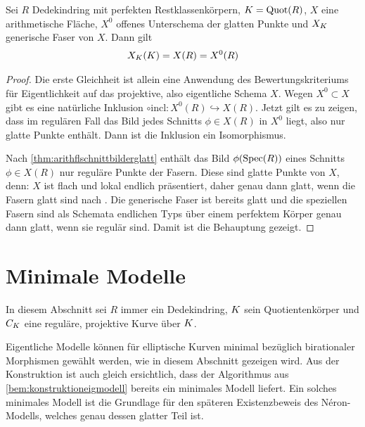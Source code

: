 \begin{Satz}\label{thm:ratpkteregulaeremodelle}
  Sei $R$ Dedekindring
  mit perfekten Restklassenkörpern,
  $K=\operatorname{Quot}(R)$,
  $X$ eine arithmetische Fläche,
  $X^0$ offenes Unterschema der glatten Punkte und
  $X_{K}$ generische Faser von $X$.
  Dann gilt
  \begin{gather*}
    X_{K}(K)=X(R)=X^0(R)
  \end{gather*}
  \begin{proof}
    Die erste Gleichheit ist allein eine Anwendung des
    Bewertungskriteriums für Eigentlichkeit auf das projektive, also
    eigentliche Schema $X$.
    Wegen $X^0\subset X$ gibt es eine natürliche Inklusion
    $\circ \text{incl}\colon X^0(R)\hookrightarrow X(R)$.
    Jetzt gilt es zu zeigen, dass im regulären Fall das Bild jedes
    Schnitts $\phi\in X(R)$ in $X^0$ liegt, also nur glatte Punkte
    enthält. Dann ist die Inklusion ein Isomorphismus.
    
    Nach \ref{thm:arithflschnittbilderglatt} enthält das Bild
    $\phi(\operatorname{Spec}(R))$ eines Schnitts $\phi\in X(R)$ nur reguläre
    Punkte der Fasern. Diese sind glatte Punkte von $X$, denn:
    $X$ ist flach und lokal endlich präsentiert, daher genau dann
    glatt, wenn die Fasern glatt sind nach
    \cite[Proposition~8.5/17]{bosch}.
    Die generische Faser ist bereits glatt und die speziellen Fasern
    sind als Schemata endlichen Typs über einem perfektem Körper
    genau dann glatt, wenn sie regulär sind.
    Damit ist die Behauptung gezeigt.
  \end{proof}
\end{Satz}


\section{Minimale Modelle}\label{chap:minmodelle}
In diesem Abschnitt sei $R$ immer ein Dedekindring,
$K$ sein Quotientenkörper und $C_{K}$ eine
reguläre, projektive Kurve über $K$.

Eigentliche Modelle können für elliptische Kurven minimal
bezüglich birationaler Morphismen gewählt werden, wie in diesem
Abschnitt gezeigen wird. Aus der Konstruktion ist auch gleich ersichtlich,
dass der Algorithmus aus \ref{bem:konstruktioneigmodell} bereits ein
minimales Modell liefert.
Ein solches minimales Modell ist die Grundlage für den späteren
Existenzbeweis des Néron-Modells, welches genau dessen glatter Teil
ist.

